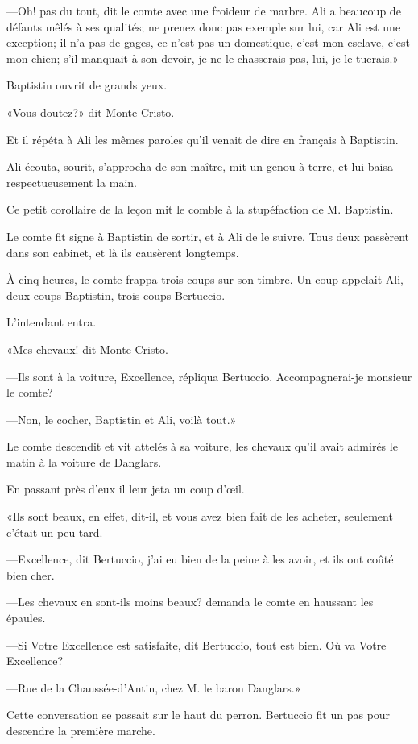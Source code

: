 —Oh! pas du tout, dit le comte avec une froideur de marbre. Ali a beaucoup de défauts mêlés à ses qualités; ne prenez donc pas exemple sur lui, car Ali est une exception; il n'a pas de gages, ce n'est pas un domestique, c'est mon esclave, c'est mon chien; s'il manquait à son devoir, je ne le chasserais pas, lui, je le tuerais.» 

Baptistin ouvrit de grands yeux. 

«Vous doutez?» dit Monte-Cristo. 

Et il répéta à Ali les mêmes paroles qu'il venait de dire en français à Baptistin. 

Ali écouta, sourit, s'approcha de son maître, mit un genou à terre, et lui baisa respectueusement la main. 

Ce petit corollaire de la leçon mit le comble à la stupéfaction de M. Baptistin. 

Le comte fit signe à Baptistin de sortir, et à Ali de le suivre. Tous deux passèrent dans son cabinet, et là ils causèrent longtemps. 

À cinq heures, le comte frappa trois coups sur son timbre. Un coup appelait Ali, deux coups Baptistin, trois coups Bertuccio.  

L'intendant entra. 

«Mes chevaux! dit Monte-Cristo. 

—Ils sont à la voiture, Excellence, répliqua Bertuccio. Accompagnerai-je monsieur le comte? 

—Non, le cocher, Baptistin et Ali, voilà tout.» 

Le comte descendit et vit attelés à sa voiture, les chevaux qu'il avait admirés le matin à la voiture de Danglars. 

En passant près d'eux il leur jeta un coup d'œil. 

«Ils sont beaux, en effet, dit-il, et vous avez bien fait de les acheter, seulement c'était un peu tard. 

—Excellence, dit Bertuccio, j'ai eu bien de la peine à les avoir, et ils ont coûté bien cher. 

—Les chevaux en sont-ils moins beaux? demanda le comte en haussant les épaules. 

—Si Votre Excellence est satisfaite, dit Bertuccio, tout est bien. Où va Votre Excellence? 

—Rue de la Chaussée-d'Antin, chez M. le baron Danglars.» 

Cette conversation se passait sur le haut du perron. Bertuccio fit un pas pour descendre la première marche. 

